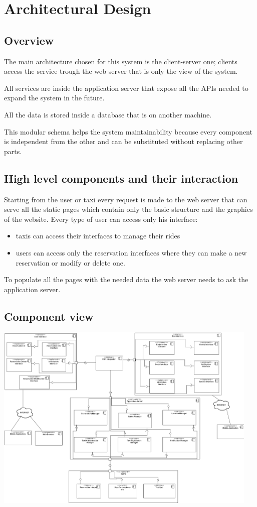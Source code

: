 \section{Architectural Design}
\subsection{Overview}
	The main architecture chosen for this system is the client-server one; clients access the service trough the web server that is only the view of the system. 
	
	All services are inside the application server that expose all the APIs needed to expand the system in the future.
	
	All the data is stored inside a database that is on another machine.

	This modular schema helps the system maintainability because every component is independent from the other and can be substituted without replacing other parts. 
\subsection{High level components and their interaction}
	Starting from the user or taxi every request is made to the web server that can serve all the static pages which contain only the basic structure and the graphics of the website. Every type of user can access only his interface:
	\begin{itemize} 
		\item taxis can access their interfaces to manage their rides 
		\item users can access only the reservation interfaces where they can make a new reservation or modify or delete one.
	\end{itemize}
	To populate all the pages with the needed data the web server needs to ask the application server.
\subsection{Component view}
	\begin{center}
		\includegraphics[width=0.95\textwidth]{./images/component_view.png}
	\end{center}
	
